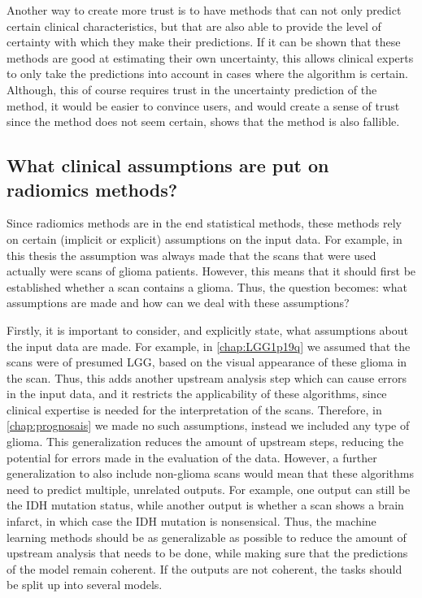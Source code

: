 Another way to create more trust is to have methods that can not only predict certain clinical characteristics, but that are also able to provide the level of certainty with which they make their predictions.
If it can be shown that these methods are good at estimating their own uncertainty, this allows clinical experts to only take the predictions into account in cases where the algorithm is certain.
Although, this of course requires trust in the uncertainty prediction of the method, it would be easier to convince users, and would create a sense of trust since the method does not seem certain, shows that the method is also fallible.

\subsection{What clinical assumptions are put on radiomics methods?}

Since radiomics methods are in the end statistical methods, these methods rely on certain (implicit or explicit) assumptions on the input data.
For example, in this thesis the assumption was always made that the scans that were used actually were scans of glioma patients.
However, this means that it should first be established whether a scan contains a glioma.
Thus, the question becomes: what assumptions are made and how can we deal with these assumptions?

Firstly, it is important to consider, and explicitly state, what assumptions about the input data are made.
For example, in \cref{chap:LGG1p19q} we assumed that the scans were of presumed \gls{LGG}, based on the visual appearance of these glioma in the scan.
Thus, this adds another upstream analysis step which can cause errors in the input data, and it restricts the applicability of these algorithms, since clinical expertise is needed for the interpretation of the scans.
Therefore, in \cref{chap:prognosais} we made no such assumptions, instead we included any type of glioma.
This generalization reduces the amount of upstream steps, reducing the potential for errors made in the evaluation of the data.
However, a further generalization to also include non-glioma scans would mean that these algorithms need to predict multiple, unrelated outputs.
For example, one output can still be the \gls{IDH} mutation status, while another output is whether a scan shows a brain infarct, in which case the \gls{IDH} mutation is nonsensical.
Thus, the machine learning methods should be as generalizable as possible to reduce the amount of upstream analysis that needs to be done, while making sure that the predictions of the model remain coherent.
If the outputs are not coherent, the tasks should be split up into several models.


